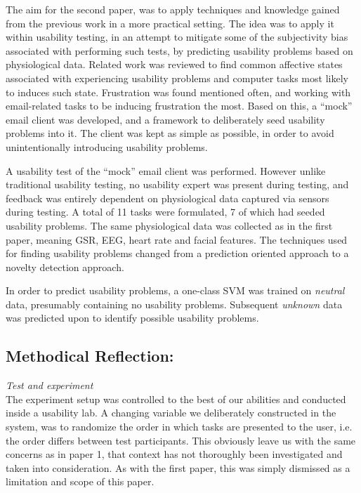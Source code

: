 The aim for the second paper, was to apply techniques and knowledge gained from the previous work in a more practical
setting. The idea was to apply it within usability testing, in an attempt to mitigate some of the subjectivity bias
associated with performing such tests, by predicting usability problems based on physiological data. Related work was
reviewed to find common affective states associated with experiencing usability problems and computer tasks most likely
to induces such state. Frustration was found mentioned often, and working with email-related tasks to be inducing
frustration the most. Based on this, a ``mock'' email client was developed, and a framework to deliberately seed
usability problems into it. The client was kept as simple as possible, in order to avoid unintentionally introducing
usability problems.

A usability test of the ``mock'' email client was performed. However unlike traditional usability testing, no usability
expert was present during testing, and feedback was entirely dependent on physiological data captured via sensors during
testing.  A total of 11 tasks were formulated, 7 of which had seeded usability problems.  The same physiological data
was collected as in the first paper, meaning GSR, EEG, heart rate and facial features.  The techniques used for finding
usability problems changed from a prediction oriented approach to a novelty detection approach.

In order to predict usability problems, a one-class SVM was trained on \textit{neutral} data, presumably containing no
usability problems. Subsequent \textit{unknown} data was predicted upon to identify possible usability problems.


\subsection{Methodical Reflection:}
\textit{Test and experiment}\\
The experiment setup was controlled to the best of our abilities and conducted inside a usability lab. A changing
variable we deliberately constructed in the system, was to randomize the order in which tasks are presented to the user,
i.e. the order differs between test participants.
This obviously leave us with the same concerns as in paper 1, that context has not thoroughly been investigated and taken
into consideration. As with the first paper, this was simply dismissed as a limitation and scope of this paper.

